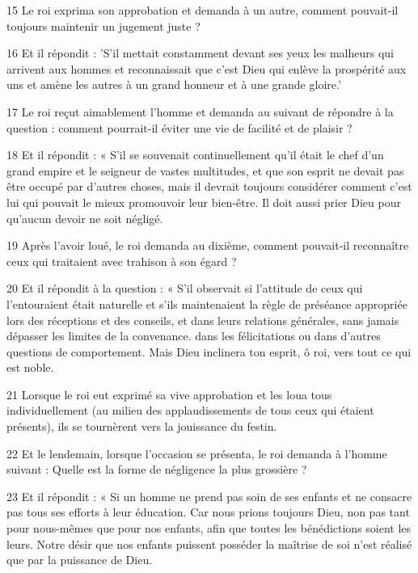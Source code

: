 \par 15 Le roi exprima son approbation et demanda à un autre, comment pouvait-il toujours maintenir un jugement juste ?

\par 16 Et il répondit : 'S'il mettait constamment devant ses yeux les malheurs qui arrivent aux hommes et reconnaissait que c'est Dieu qui enlève la prospérité aux uns et amène les autres à un grand honneur et à une grande gloire.'

\par 17 Le roi reçut aimablement l'homme et demanda au suivant de répondre à la question : comment pourrait-il éviter une vie de facilité et de plaisir ?

\par 18 Et il répondit : « S'il se souvenait continuellement qu'il était le chef d'un grand empire et le seigneur de vastes multitudes, et que son esprit ne devait pas être occupé par d'autres choses, mais il devrait toujours considérer comment c'est lui qui pouvait le mieux promouvoir leur bien-être. Il doit aussi prier Dieu pour qu'aucun devoir ne soit négligé.

\par 19 Après l'avoir loué, le roi demanda au dixième, comment pouvait-il reconnaître ceux qui traitaient avec trahison à son égard ?

\par 20 Et il répondit à la question : « S'il observait si l'attitude de ceux qui l'entouraient était naturelle et s'ils maintenaient la règle de préséance appropriée lors des réceptions et des conseils, et dans leurs relations générales, sans jamais dépasser les limites de la convenance. dans les félicitations ou dans d'autres questions de comportement. Mais Dieu inclinera ton esprit, ô roi, vers tout ce qui est noble.

\par 21 Lorsque le roi eut exprimé sa vive approbation et les loua tous individuellement (au milieu des applaudissements de tous ceux qui étaient présents), ils se tournèrent vers la jouissance du festin.

\par 22 Et le lendemain, lorsque l'occasion se présenta, le roi demanda à l'homme suivant : Quelle est la forme de négligence la plus grossière ?

\par 23 Et il répondit : « Si un homme ne prend pas soin de ses enfants et ne consacre pas tous ses efforts à leur éducation. Car nous prions toujours Dieu, non pas tant pour nous-mêmes que pour nos enfants, afin que toutes les bénédictions soient les leurs. Notre désir que nos enfants puissent posséder la maîtrise de soi n'est réalisé que par la puissance de Dieu.

